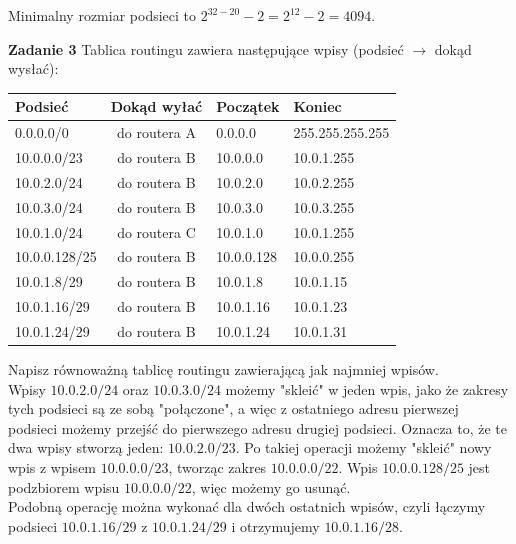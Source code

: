 \documentclass[a4paper,12pt]{article}
\begin{document}
\noindent Minimalny rozmiar podsieci to $2^{32-20}-2 = 2^{12} - 2 = 4094$.

\newpage
\noindent \textbf{Zadanie 3} \newline
Tablica routingu zawiera następujące wpisy (podsieć $\to$ dokąd wysłać):
\begin{center}
\begin{tabular}{|l|c|l|l|}
    \hline
    Podsieć        & Dokąd wyłać  & Początek    & Koniec \\ 
    \hline
    0.0.0.0/0      & do routera A & 0.0.0.0     & 255.255.255.255 \\
    10.0.0.0/23    & do routera B & 10.0.0.0    & 10.0.1.255 \\
    10.0.2.0/24    & do routera B & 10.0.2.0    & 10.0.2.255 \\
    10.0.3.0/24    & do routera B & 10.0.3.0    & 10.0.3.255 \\
    10.0.1.0/24    & do routera C & 10.0.1.0    & 10.0.1.255 \\
    10.0.0.128/25  & do routera B & 10.0.0.128  & 10.0.0.255 \\
    10.0.1.8/29    & do routera B & 10.0.1.8    & 10.0.1.15 \\
    10.0.1.16/29   & do routera B & 10.0.1.16   & 10.0.1.23 \\
    10.0.1.24/29   & do routera B & 10.0.1.24   & 10.0.1.31 \\ \hline
\end{tabular}
\end{center}

\noindent Napisz równoważną tablicę routingu zawierającą jak najmniej wpisów. \\

\noindent Wpisy $10.0.2.0/24$ oraz $10.0.3.0/24$ możemy "skleić" w jeden wpis,
jako że zakresy tych podsieci są ze sobą "połączone", a więc z ostatniego adresu
pierwszej podsieci możemy przejść do pierwszego adresu drugiej podsieci. Oznacza
to, że te dwa wpisy stworzą jeden: $10.0.2.0/23$. Po takiej operacji możemy
"skleić" nowy wpis z wpisem $10.0.0.0/23$, tworząc zakres $10.0.0.0/22$. Wpis 
$10.0.0.128/25$ jest podzbiorem wpisu $10.0.0.0/22$, więc możemy go usunąć. \\

\noindent Podobną operację można wykonać dla dwóch ostatnich wpisów, czyli 
łączymy podsieci $10.0.1.16/29$ z $10.0.1.24/29$ i otrzymujemy $10.0.1.16/28$. \\
\end{document}
